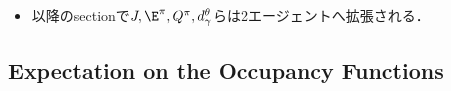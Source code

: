 \documentclass[a4paper,10pt,dvipdfmx]{jsarticle}
\begin{document}
\begin{itemize}
\begin{itemize}
        \begin{itemize}
            \item $d_{\gamma}^{\theta}$は次のように定義される：$d_{\gamma}^{\theta}(s):=(1-\gamma)\sum_{t=0}^\infty\gamma^t\rho_t^{\theta}(s_t)$, where
            \begin{align}
                &\rho_0^{\theta}(s):=\rho_0(s),\\
                &\begin{multlined}
                    \rho_t^{\theta}(s):=\left\{\int_{s_k\in\mathcal
                    S}\int_{a_k\in\mathcal{A}}\right\}_{k=0}^{t-1}\rho_0(s_0)\pi_{\theta}(a_0|s_0)\prod_{k=1}^{t-1}p(s_{k}|s_{k-1},a_{k-1})\pi_{\theta}(a_k|s_k)\\
                    \cdot p(s|s_{t-1},a_{t-1})\{\rmd s_k\rmd a_k\}_{k=0}^{t-1}\quad(t\ge 1).
                \end{multlined}
            \end{align}
        \end{itemize}
    \end{itemize}
    \item 以降のsectionで$J, \E^\pi, Q^\pi, d_{\gamma}^{\theta}$らは2エージェントへ拡張される．
\end{itemize}


\subsection{Expectation on the Occupancy Functions}\label{sec:occupancy_func_and_expectation}
\end{document}
